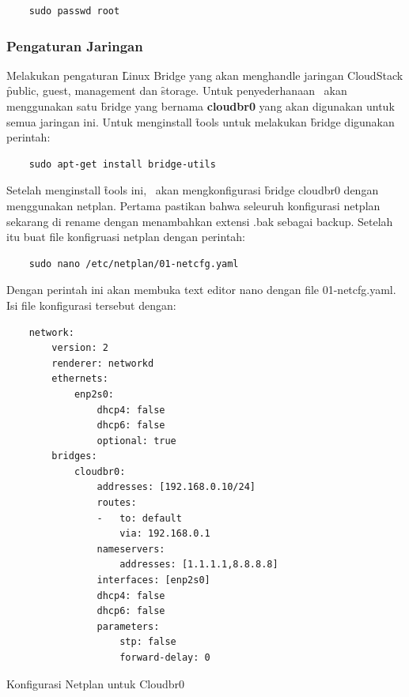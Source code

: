 \begin{verbatim}
    sudo passwd root
\end{verbatim}

\subsubsection{Pengaturan Jaringan}
Melakukan pengaturan \f{Linux Bridge} yang akan menghandle jaringan CloudStack \f{public, guest, management} dan \f{storage}. Untuk penyederhanaan \saya\ akan menggunakan satu \f{bridge} yang bernama \textbf{cloudbr0} yang akan digunakan untuk semua jaringan ini. Untuk menginstall \f{tools} untuk melakukan \f{bridge} digunakan perintah:

\begin{verbatim}
    sudo apt-get install bridge-utils
\end{verbatim}

Setelah menginstall \f{tools} ini, \saya\ akan mengkonfigurasi \f{bridge} cloudbr0 dengan menggunakan netplan. Pertama pastikan bahwa seleuruh konfigurasi netplan sekarang di rename dengan menambahkan extensi .bak sebagai backup. Setelah itu buat file konfigruasi netplan dengan perintah:

\begin{verbatim}
    sudo nano /etc/netplan/01-netcfg.yaml
\end{verbatim}

Dengan perintah ini akan membuka text editor nano dengan file 01-netcfg.yaml. Isi file konfigurasi tersebut dengan:

\begin{listing}[H]
    \begin{verbatim}
    network:
        version: 2
        renderer: networkd
        ethernets:
            enp2s0:
                dhcp4: false
                dhcp6: false
                optional: true
        bridges:
            cloudbr0:
                addresses: [192.168.0.10/24]
                routes:
                -   to: default
                    via: 192.168.0.1
                nameservers:
                    addresses: [1.1.1.1,8.8.8.8]
                interfaces: [enp2s0]
                dhcp4: false
                dhcp6: false
                parameters:
                    stp: false
                    forward-delay: 0
    \end{verbatim}
    \caption{Konfigurasi Netplan untuk Cloudbr0}
    \label{code:netplan_config}
\end{listing}

